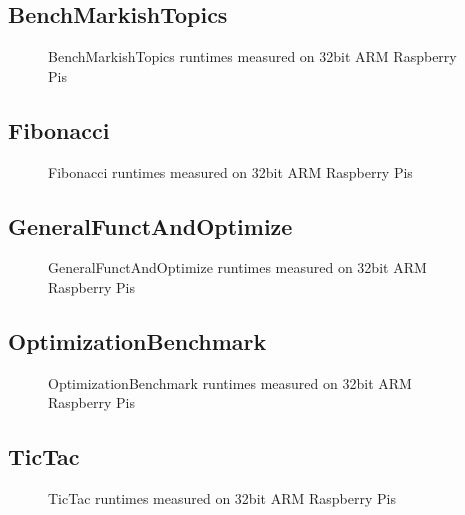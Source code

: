 
\newpage
\subsection{BenchMarkishTopics}
    
    \begin{figure}[h]
	    \centering
		
        \caption{BenchMarkishTopics runtimes measured on 32bit ARM Raspberry Pis}
	\end{figure}
    


\newpage
\subsection{Fibonacci}
    
    \begin{figure}[h]
	    \centering
		
        \caption{Fibonacci runtimes measured on 32bit ARM Raspberry Pis}
	\end{figure}
    


\newpage
\subsection{GeneralFunctAndOptimize}
    
    \begin{figure}[h]
	    \centering
		
        \caption{GeneralFunctAndOptimize runtimes measured on 32bit ARM Raspberry Pis}
	\end{figure}
    


\newpage
\subsection{OptimizationBenchmark}
    
    \begin{figure}[h]
	    \centering
		
        \caption{OptimizationBenchmark runtimes measured on 32bit ARM Raspberry Pis}
	\end{figure}
    


\newpage
\subsection{TicTac}
    
    \begin{figure}[h]
	    \centering
		
        \caption{TicTac runtimes measured on 32bit ARM Raspberry Pis}
	\end{figure}
    


